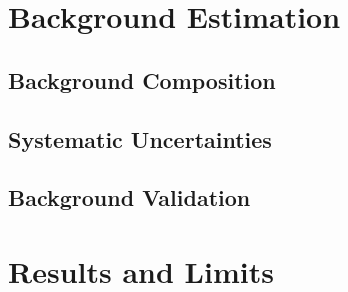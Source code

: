 %
%
%
%



\section{Background Estimation}

\subsection{Background Composition}

\subsection{Systematic Uncertainties}

\subsection{Background Validation}

\section{Results and Limits}